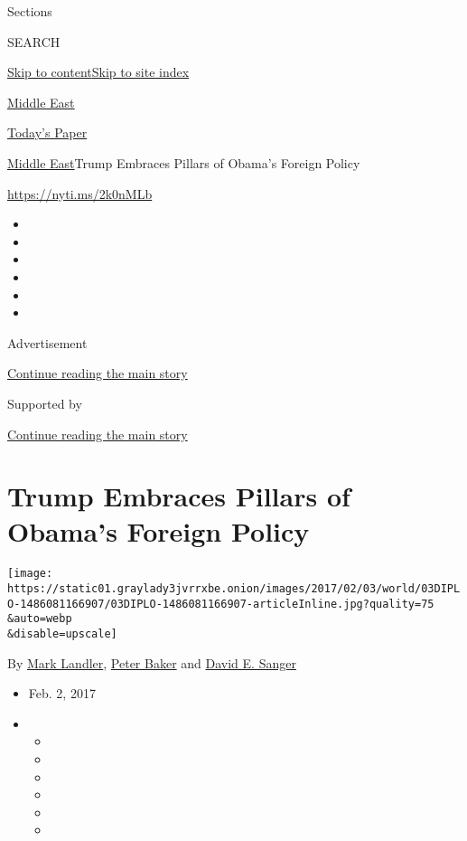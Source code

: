 Sections

SEARCH

\protect\hyperlink{site-content}{Skip to
content}\protect\hyperlink{site-index}{Skip to site index}

\href{https://www.nytimes3xbfgragh.onion/section/world/middleeast}{Middle
East}

\href{https://myaccount.nytimes3xbfgragh.onion/auth/login?response_type=cookie\&client_id=vi}{}

\href{https://www.nytimes3xbfgragh.onion/section/todayspaper}{Today's
Paper}

\href{/section/world/middleeast}{Middle East}\textbar{}Trump Embraces
Pillars of Obama's Foreign Policy

\url{https://nyti.ms/2k0nMLb}

\begin{itemize}
\item
\item
\item
\item
\item
\item
\end{itemize}

Advertisement

\protect\hyperlink{after-top}{Continue reading the main story}

Supported by

\protect\hyperlink{after-sponsor}{Continue reading the main story}

\hypertarget{trump-embraces-pillars-of-obamas-foreign-policy}{%
\section{Trump Embraces Pillars of Obama's Foreign
Policy}\label{trump-embraces-pillars-of-obamas-foreign-policy}}

\texttt{[image: https://static01.graylady3jvrrxbe.onion/images/2017/02/03/world/03DIPLO-1486081166907/03DIPLO-1486081166907-articleInline.jpg?quality=75\\\&auto=webp\\\&disable=upscale]}

By \href{http://www.nytimes3xbfgragh.onion/by/mark-landler}{Mark
Landler}, \href{http://www.nytimes3xbfgragh.onion/by/peter-baker}{Peter
Baker} and
\href{http://www.nytimes3xbfgragh.onion/by/david-e-sanger}{David E.
Sanger}

\begin{itemize}
\item
  Feb. 2, 2017
\item
  \begin{itemize}
  \item
  \item
  \item
  \item
  \item
  \item
  \end{itemize}
\end{itemize}

